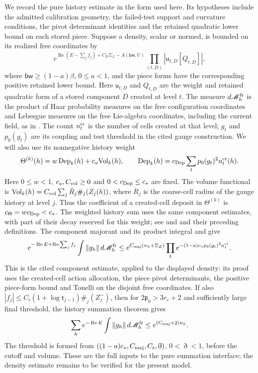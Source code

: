 \documentclass[11pt,letterpaper,reqno]{amsart}
\theoremstyle{definition}
\theoremstyle{remark}
\begin{document}
We record the pure history estimate in the form used here.
Its hypotheses include the admitted calibration geometry,
the failed-test support and curvature conditions, the pivot
determinant identities and the retained quadratic lower bound
on each stored piece. Suppose a density, scalar or normed,
is bounded on its realized free coordinates by
\[
 e^{\operatorname{Re}(E-\sum_j f_j)+C_E\Sigma_{\mathcal L}-A(\mathsf{bw},U)}
 \prod_{(t,D)}|\mathsf u_{t,D}[Q_{t,D}]|,
\]
where $\mathsf{bw}\ge(1-a)\beta$, $0\le a<1$, and the
piece forms have the corresponding positive retained lower
bound. Here $\mathsf u_{t,D}$ and $Q_{t,D}$ are the weight and
retained quadratic form of a stored component $D$ created at level
$t$. The measure $d\mathscr M_h^{\rm fr}$ is the product of Haar
probability measures on the free configuration coordinates and
Lebesgue measures on the free Lie-algebra coordinates, including
the current field, as in \cite[eq.~4.cccli]{YMM1}.
The count $n_t^{\rm cr}$
is the number of cells created at that level; $g_t$ and $p_0(g_t)$
are its coupling and test threshold in the cited gauge construction.
We will also use its nonnegative history weight
\[
 \Theta^{(k)}(h)=w\,\mathrm{Dep}_k(h)+c_a\mathrm{Vol}_k(h),
 \qquad
 \mathrm{Dep}_k(h)=c_{\rm Dep}\sum_t p_0(g_t)^2n_t^{\rm cr}(h).
\]
Here $0\le w<1$, $c_a,C_{\rm vol}\ge0$ and
$0<c_{\rm Dep}\le c_*$ are fixed. The volume functional is
$\mathrm{Vol}_k(h)=C_{\rm vol}\sum_j\check R_j\#_j(Z_j(h))$,
where $\check R_j$ is the coarse-cell radius of the gauge history
at level $j$. Thus the coefficient of a created-cell deposit in
$\Theta^{(k)}$ is $c_\Theta=wc_{\rm Dep}<c_*$.
The weighted history sum uses the same component estimates,
with part of their decay reserved for this weight; see
\cite[eq.~4.dcccxxi]{YMM1} and \cite[eq.~4.dcccxxii]{YMM1} and their preceding definitions.
The component majorant and its product integral
\cite[Prop.~4.153]{YMM1} and \cite[Prop.~4.154]{YMM1} give
\begin{equation}\label{eq:qcd-history-interface}
 e^{-\operatorname{Re}E+\operatorname{Re}\sum_jf_j}
 \int\|g_h\|\,d\mathscr M_h^{\rm fr}
 \le e^{C_{\rm maj}(n_k+\Sigma_Z)}
 \prod_t e^{-(1-a)c_*p_0(g_t)^2n_t^{\rm cr}}.
\end{equation}
This is the cited component estimate, applied to the displayed
density: its proof uses the created-cell action allocation,
the piece pivot determinants, the positive piece-form bound
and Tonelli on the disjoint free coordinates. If also
$|f_j|\le C_\flat(1+\log\mathsf t_{j-1})\#_j(Z_j^\sim)$,
then for $2\mathfrak p_0>3r_c+2$ and sufficiently large final
threshold, the history summation theorem gives
\begin{equation}\label{eq:qcd-history-sum-interface}
 \sum_h e^{-\operatorname{Re}E}\int\|g_h\|
          \,d\mathscr M_h^{\rm fr}\le e^{(C_{\rm maj}+2)n_k}.
\end{equation}
The threshold is formed from
$((1-a)c_*,C_{\rm maj},C_\flat,\eth)$, $0<\eth<1$, before
the cutoff and volume. These are the full inputs to the pure
summation interface; the density estimate remains to be
verified for the present model.
\end{document}
